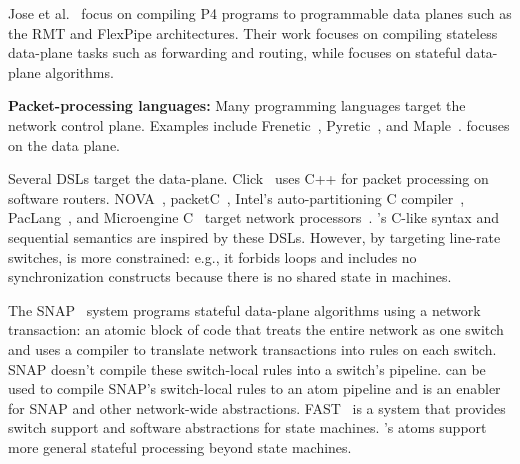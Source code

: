 Jose et al.~\cite{lavanya_compiler} focus on compiling P4 programs to
programmable data planes such as the RMT and FlexPipe architectures. Their work
focuses on compiling stateless data-plane tasks such as forwarding and routing,
while \pktlanguage focuses on stateful data-plane algorithms.

\textbf{Packet-processing languages:}
Many programming languages target the network control plane. Examples include
Frenetic~\cite{frenetic}, Pyretic~\cite{pyretic}, and Maple~\cite{maple}.
\pktlanguage focuses on the data plane.

Several DSLs target the data-plane. Click~\cite{click} uses C++ for packet
processing on software routers. NOVA~\cite{nova}, packetC~\cite{packetc},
Intel's auto-partitioning C compiler~\cite{intel_uiuc_pldi},
PacLang~\cite{paclang_lang, paclang_partitioner}, and Microengine
C~\cite{microenginec, intel_ixa} target network processors~\cite{ixp2800,
ixp4xx}. \pktlanguage's C-like syntax and sequential semantics are inspired by
these DSLs. However, by targeting line-rate switches, \pktlanguage is more
constrained: e.g., it forbids loops and includes no synchronization constructs
because there is no shared state in \absmachine machines.

The SNAP~\cite{snap} system programs stateful data-plane algorithms using a
network transaction: an atomic block of code that treats the entire network as
one switch~\cite{onebigswitch} and uses a compiler to translate network
transactions into rules on each switch. SNAP doesn't compile these switch-local
rules into a switch's pipeline. \pktlanguage can be used to compile SNAP's
switch-local rules to an atom pipeline and is an enabler for SNAP and other
network-wide abstractions. FAST~\cite{fast} is a system that provides switch
support and software abstractions for state machines. \absmachine's atoms
support more general stateful processing beyond state machines.
